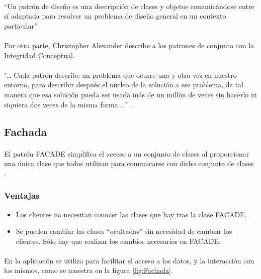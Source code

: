 \paragraph{}“Un patrón de diseño es una descripción de clases y objetos comunicándose entre sí adaptada para resolver un problema de diseño general en un contexto particular” \cite{gamma_reutilizacion_2015}
\paragraph{}Por otra parte, Christopher Alexander describe a los patrones de conjunto con la Integridad Conceptual.
\paragraph{}"…  Cada patrón describe un problema que ocurre una y otra vez en nuestro entorno, para describir después el núcleo de la solución a ese problema, de tal manera que esa solución pueda ser usada más de un millón de veces sin hacerlo ni siquiera dos veces de la misma forma …" \cite{alexander_pattern_1997}.

\subsection{Fachada}
\paragraph{}El patrón FACADE simplifica el acceso a un conjunto de clases al proporcionar una única clase que todos utilizan para comunicarse con dicho conjunto de clases \cite{gamma_reutilizacion_2015}.
\subsubsection*{Ventajas}
\begin{itemize}
	\item Los clientes no necesitan conocer las clases que hay tras la clase FACADE.
	\item Se pueden cambiar las clases “ocultadas” sin necesidad de cambiar los clientes. Sólo hay que realizar los cambios necesarios en FACADE.
\end{itemize}

\paragraph{}En la aplicación se utiliza para facilitar el acceso a los datos, y la interacción con los mismos, como se muestra en la figura \ref{fig:Fachada}.

